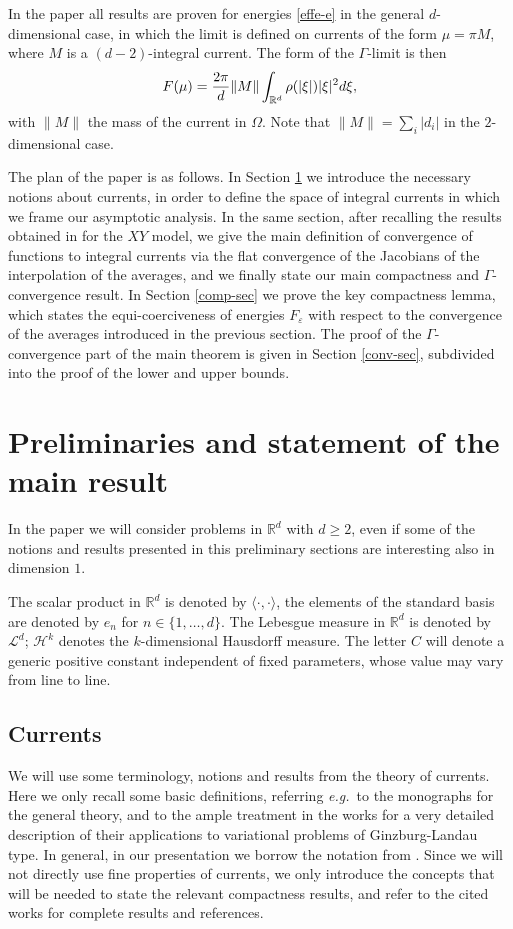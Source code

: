 \documentclass[11pt]{article}
\def\e{\varepsilon}
\begin{document}
 
In the paper all results are proven for  energies \eqref{effe-e} in the general $d$-dimensional case, in which the limit is defined on currents of the form $\mu=\pi M$, where $M$ is a $(d-2)$-integral current. The form of the $\Gamma$-limit is then  
 $$
 F(\mu)={2\pi\over d}\|M\|\int_{\mathbb R^d}{\rho(|\xi|)|\xi|^2}d\xi,
 $$
with $\|M\|$ the mass of the current in $\Omega$. Note that $\|M\|=\sum_i|d_i|$ in the $2$-dimensional case.
 
\medskip 

The plan of the paper is as follows. 
In Section \ref{prel} we introduce the necessary notions about currents, in order to define the space of integral currents in which we frame our asymptotic analysis. In the same section, after recalling the results obtained in 
\cite{AC} for the $XY$ model, we give the main definition of convergence of functions to integral currents via the flat convergence of the Jacobians of the interpolation of the averages, and we finally  
state our main compactness and $\Gamma$-convergence result. In Section \ref{comp-sec} we prove the key compactness lemma, which states the equi-coerciveness of energies $F_\e$ with respect to the convergence of the averages introduced in the previous section. The proof of the $\Gamma$-convergence part of the main theorem is given in Section \ref{conv-sec}, subdivided into the proof of the lower and upper bounds.  


\section{Preliminaries and statement of the main result}\label{prel} 
In the paper we will consider problems in $\mathbb R^d$ with $d\geq 2$, even if some of the notions and results presented in this preliminary sections are interesting also in dimension $1$. 

The scalar product in $\mathbb R^d$ is denoted by $\langle\cdot,\cdot\rangle$, the elements of the standard basis are denoted by $e_n$ for  $n\in\{1,\dots, d\}$. The Lebesgue measure in $\mathbb R^d$ is denoted by $\mathcal L^d$; $\mathcal H^k$ denotes the $k$-dimensional Hausdorff measure.  
The letter $C$ will denote a generic positive constant independent of
fixed parameters, whose value may vary from line to line. 

\subsection{Currents}
We will use some terminology, notions and results from the theory of currents. 
Here we only recall some basic definitions, referring {\em e.g.}~to 
the monographs \cite{fed,GMS,simon} for the general theory, 
and to the ample treatment in the works \cite{A,ABS,J,JS} for a very detailed description of their applications to variational problems of Ginzburg-Landau type. In general, in our presentation we borrow the notation from \cite[Chapter 6]{simon}. 
Since we will not directly use fine properties of currents, we only introduce the concepts 
that will be needed to state the relevant compactness results, and refer to the cited works for complete results and references.
\end{document}
